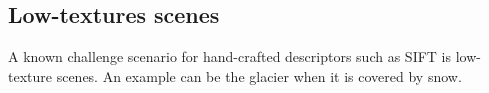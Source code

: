 






\subsection{Low-textures scenes}

A known challenge scenario for hand-crafted descriptors such as SIFT is low-texture scenes. 
An example can be the glacier when it is covered by snow.



